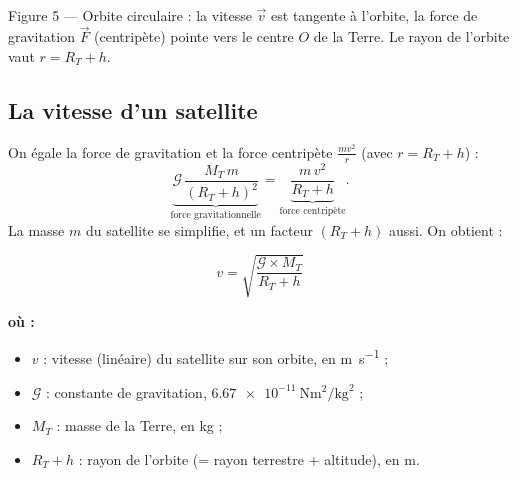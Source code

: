 \documentclass[11pt,a4paper]{article}
\newenvironment{ou}{%
  \par\smallskip\noindent\textbf{où :}\nopagebreak
  \begin{itemize}[leftmargin=1.8em,topsep=2pt,itemsep=1.5pt,parsep=0pt]}%
  {\end{itemize}}
\newcommand{\vv}[1]{\vec{#1}}
\newcommand{\Grav}{\mathcal{G}}        %
\begin{document}
\begin{center}
\\[2pt]
{\footnotesize Figure 5 --- Orbite circulaire : la vitesse $\vv v$ est tangente à
l'orbite, la force de gravitation $\vv F$ (centripète) pointe vers le centre $O$ de la
Terre. Le rayon de l'orbite vaut $r=R_T+h$.}
\end{center}

\subsection{La vitesse d'un satellite}

On égale la force de gravitation et la force centripète $\frac{mv^2}{r}$ (avec
$r=R_T+h$) :
\[
\underbrace{\Grav\,\frac{M_T\,m}{(R_T+h)^2}}_{\text{force gravitationnelle}}
=\underbrace{\frac{m\,v^2}{R_T+h}}_{\text{force centripète}} .
\]
La masse $m$ du satellite se simplifie, et un facteur $(R_T+h)$ aussi. On obtient :

\begin{formule}
\[
\boxed{\;v=\sqrt{\dfrac{\Grav\times M_T}{R_T+h}}\;}
\]
\begin{ou}
  \item $v$ : vitesse (linéaire) du satellite sur son orbite, en \si{\metre\per\second} ;
  \item $\Grav$ : constante de gravitation, $\SI{6.67e-11}{\newton\metre\squared\per\kilogram\squared}$ ;
  \item $M_T$ : masse de la Terre, en \si{\kilogram} ;
  \item $R_T+h$ : rayon de l'orbite (= rayon terrestre + altitude), en \si{\metre}.
\end{ou}
\end{formule}
\end{document}
